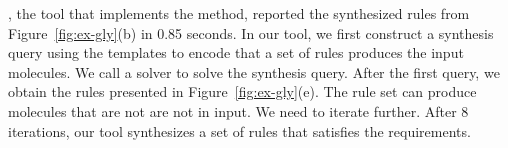 \ourtool, the tool that implements the method, reported the synthesized rules from
Figure~\ref{fig:ex-gly}(b) in 0.85 seconds.
In our tool, we first construct a synthesis query using the templates to encode
that a set of rules produces the input molecules.
We call a solver to solve the synthesis query.
After the first query, we obtain the rules presented in Figure~\ref{fig:ex-gly}(e).
The rule set can produce molecules that are not are not in input.
We need to iterate further.
After 8 iterations, our tool synthesizes a set of rules that
satisfies the requirements.



